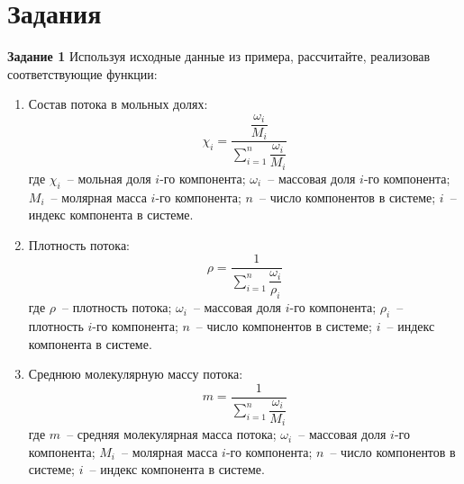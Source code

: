 \documentclass[aspectratio=169, mathserif]{beamer}%
\begin{document}
\section{Задания}
\sectionframe

\begin{frame}[fragile]
\scriptsize
\begin{alertblock}{\textbf{Задание 1}}
Используя исходные данные из примера, рассчитайте, реализовав соответствующие функции:
\end{alertblock}
\vfill
\begin{enumerate}
	\item Состав потока в мольных долях: 
	$$
		\chi _i = \dfrac{\dfrac{\omega _i}{M_i}}{\sum \limits_{i=1}^{n}\dfrac{\omega _i}{M_i}}
	$$
	где $\chi _i$~-- мольная доля $i$-го компонента; $\omega _i$~-- массовая доля $i$-го компонента; $M_i$~-- молярная масса $i$-го компонента; $n$~-- число компонентов в системе; $i$~-- индекс компонента в системе.
	\item Плотность потока:
	$$
		\rho = \dfrac{1}{\sum \limits_{i=1}^{n}\dfrac{\omega_i}{\rho_i}}
	$$
	где $\rho$~-- плотность потока; $\omega _i$~-- массовая доля $i$-го компонента; $\rho _i$~-- плотность $i$-го компонента; $n$~-- число компонентов в системе; $i$~-- индекс компонента в системе.
	\item Среднюю молекулярную массу потока:
	$$
		m = \dfrac{1}{\sum \limits_{i=1}^{n}\dfrac{\omega_i}{M_i}}
	$$
	где $m$~-- средняя молекулярная масса потока; $\omega _i$~-- массовая доля $i$-го компонента; $M_i$~-- молярная масса $i$-го компонента; $n$~-- число компонентов в системе; $i$~-- индекс компонента в системе.
\end{enumerate}
\vfill
\end{frame}
\end{document}
